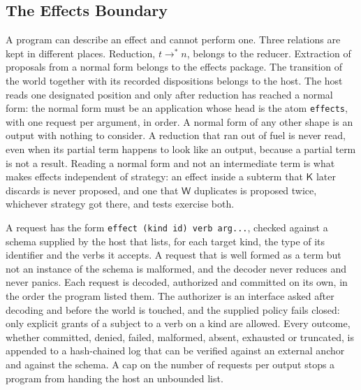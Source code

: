 \documentclass[11pt]{article}
\theoremstyle{definition}
\theoremstyle{remark}
\newcommand{\cK}{\mathsf{K}}
\newcommand{\cW}{\mathsf{W}}
\begin{document}
\subsection{The Effects Boundary}

A program can describe an effect and cannot perform one. Three relations are kept in different places. Reduction, $t\to^{*}n$, belongs to the reducer. Extraction of proposals from a normal form belongs to the effects package. The transition of the world together with its recorded dispositions belongs to the host. The host reads one designated position and only after reduction has reached a normal form: the normal form must be an application whose head is the atom \texttt{effects}, with one request per argument, in order. A normal form of any other shape is an output with nothing to consider. A reduction that ran out of fuel is never read, even when its partial term happens to look like an output, because a partial term is not a result. Reading a normal form and not an intermediate term is what makes effects independent of strategy: an effect inside a subterm that $\cK$ later discards is never proposed, and one that $\cW$ duplicates is proposed twice, whichever strategy got there, and tests exercise both.

A request has the form \texttt{effect (kind id) verb arg...}, checked against a schema supplied by the host that lists, for each target kind, the type of its identifier and the verbs it accepts. A request that is well formed as a term but not an instance of the schema is malformed, and the decoder never reduces and never panics. Each request is decoded, authorized and committed on its own, in the order the program listed them. The authorizer is an interface asked after decoding and before the world is touched, and the supplied policy fails closed: only explicit grants of a subject to a verb on a kind are allowed. Every outcome, whether committed, denied, failed, malformed, absent, exhausted or truncated, is appended to a hash-chained log that can be verified against an external anchor and against the schema. A cap on the number of requests per output stops a program from handing the host an unbounded list.
\end{document}
